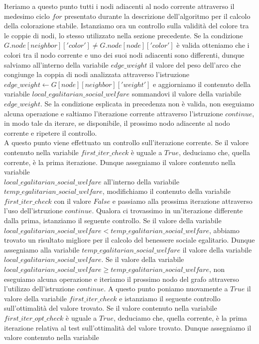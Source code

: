 Iteriamo a questo punto tutti i nodi adiacenti al nodo corrente attraverso il medesimo ciclo $for$ presentato durante la descrizione dell'algoritmo per il calcolo della colorazione stabile. Istanziamo ora un controllo sulla validità del colore tra le coppie di nodi, lo stesso utilizzato nella sezione precedente. Se la condizione $G.node[neighbor]['color'] \neq G.node[node]['color']$ è valida otteniamo che i colori tra il nodo corrente e uno dei suoi nodi adiacenti sono differenti, dunque salviamo all'interno della variabile $edge\_weight$ il valore del peso dell'arco che congiunge la coppia di nodi analizzata attraverso l'istruzione $edge\_weight\gets G[node][neighbor]['weight']$ e aggiorniamo il contenuto della variabile $local\_egalitarian\_social\_welfare$ sommandovi il valore della variabile $edge\_weight$. Se la condizione esplicata in precedenza non è valida, non eseguiamo alcuna operazione e saltiamo l'iterazione corrente attraverso l'istruzione $continue$, in modo tale da iterare, se disponibile, il prossimo nodo adiacente al nodo corrente e ripetere il controllo.\\
A questo punto viene effettuato un controllo sull'iterazione corrente. Se il valore contenuto nella variabile $first\_iter\_check$ è uguale a $True$, deduciamo che, quella corrente, è la prima iterazione. Dunque assegniamo il valore contenuto nella variabile \\
$local\_egalitarian\_social\_welfare$ all'interno della variabile \\
$temp\_egalitarian\_social\_welfare$, modifichiamo il contenuto della variabile $first\_iter\_check$ con il valore $False$ e passiamo alla prossima iterazione attraverso l'uso dell'istruzione $continue$. Qualora ci trovassimo in un'iterazione differente dalla prima, istanziamo il seguente controllo. Se il valore della variabile \\
$local\_egalitarian\_social\_welfare < temp\_egalitarian\_social\_welfare$, abbiamo trovato un risultato migliore per il calcolo del benessere sociale egalitario. Dunque assegniamo alla variabile $temp\_egalitarian\_social\_welfare$ il valore della variabile $local\_egalitarian\_social\_welfare$. Se il valore della variabile \\
$local\_egalitarian\_social\_welfare \geq temp\_egalitarian\_social\_welfare$, non eseguiamo alcuna operazione e iteriamo il prossimo nodo del grafo attraverso l'utilizzo dell'istruzione $continue$. A questo punto poniamo nuovamente a $True$ il valore della variabile $first\_iter\_check$ e istanziamo il seguente controllo sull'ottimalità del valore trovato. Se il valore contenuto nella variabile $first\_iter\_opt\_check$ è uguale a $True$, deduciamo che, quella corrente, è la prima iterazione relativa al test sull'ottimalità del valore trovato. Dunque assegniamo il valore contenuto nella variabile \\
